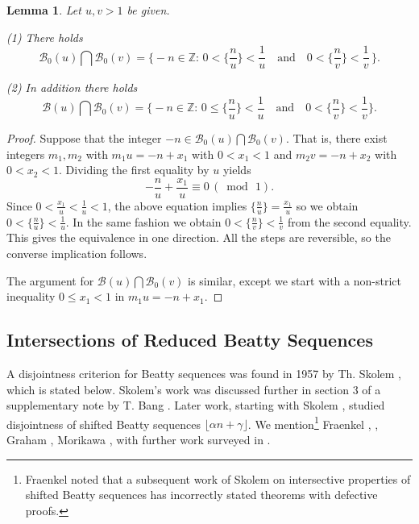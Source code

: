 \documentclass[12pt,letterpaper, reqno]{amsart}
\newtheorem{lem}[thm]{Lemma}
\theoremstyle{definition}
\theoremstyle{remark}
\newcommand{\ZZ}{\ensuremath{\mathbb{Z}}}
\newcommand{\sB}{{\mathcal B}}
\begin{document}
\begin{lem}\label{lem:48}
 Let  $u, v >1$ be given. 
 
 (1) There holds
\begin{equation*}
\sB_0(u) \bigcap \sB_0(v) =  \big\{-n \in \ZZ: \, 0< \{ \frac{n}{u}\} < \frac{1}{u}  \quad \mbox{and} \quad 0 < \{ \frac{n}{v}\} < \frac{1}{v} \, \big\}.
\end{equation*}

(2)  In addition there holds
 \begin{equation*}
\sB(u) \bigcap \sB_0(v) =  \big\{ -n \in \ZZ: \,   0 \le \{  \frac{n}{u}\} < \frac{1}{u}  \quad \mbox{and} \quad 0 < \{ \frac{n}{v}\} < \frac{1}{v} \big\}.
\end{equation*}
 \end{lem}
 
 
\begin{proof} 
Suppose that the integer $-n \in \sB_0(u) \bigcap \sB_0(v)$. That is, there
exist integers $m_1,m_2$ with
$m_1u = -n + x_1$ with $0< x_1 <1$ and $m_2 v= -n+ x_2$ with $0< x_2 <1$.
Dividing the first equality by $u$ yields 
$$-\frac{n}{u} + \frac{x_1}{u} \equiv 0 \, (\bmod \, 1).$$
Since $0 < \frac{x_1}{u} < \frac{1}{u}<1$, the above equation implies  $ \{ \frac{n}{u} \}= \frac{x_1}{u}$ 
so we obtain $ 0 < \{ \frac{n}{u} \}< \frac{1}{u}$. In the same fashion we obtain $0 <\{ \frac{n}{v} \}< \frac{1}{v}$
from the second equality. This gives the equivalence in one direction.
All the steps are reversible, so the converse implication  follows.

The argument for $\sB(u) \bigcap \sB_0(v)$ is similar, except we start with 
a non-strict inequality $0 \le x_1<1$ in $m_1u= -n+ x_1$.
\end{proof}

%
%
\subsection{Intersections of  Reduced Beatty Sequences  }\label{sec:43}

A disjointness  criterion for  Beatty
sequences was found in 1957 by Th. Skolem \cite[Theorem 8]{Sko57},
which is stated below.  
Skolem's work was discussed
further in  section 3  of a
supplementary note by T. Bang \cite{Ban57}. Later work,
starting with Skolem \cite{Sko57b},  studied disjointness of shifted Beatty 
sequences $\lfloor \alpha n + \gamma\rfloor$.
We mention\footnote{Fraenkel \cite{Fra69} noted that 
a subsequent work of Skolem \cite{Sko57b} on intersective properties of shifted Beatty sequences
has incorrectly stated theorems with defective proofs.} Fraenkel \cite{Fra69}, \cite{Fra73} , Graham \cite{Gr70}, Morikawa \cite{Mor85}, 
with further work surveyed in \cite{OB03}.  
\end{document}
